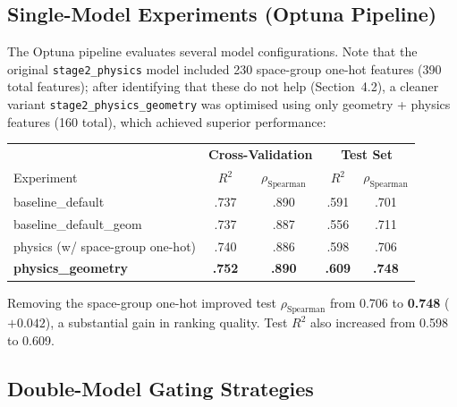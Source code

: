 \documentclass[11pt,a4paper]{article}
\newcommand{\Rtwo}{R^{2}}
\newcommand{\rhoS}{\rho_{\text{Spearman}}}
\begin{document}
\subsection{Single-Model Experiments (Optuna Pipeline)}

The Optuna pipeline evaluates several model configurations.  Note that the
original \texttt{stage2\_physics} model included 230 space-group one-hot
features (390 total features); after identifying that these do not help
(Section~4.2), a cleaner variant \texttt{stage2\_physics\_geometry} was
optimised using only geometry + physics features (160 total), which achieved
superior performance:

\begin{center}
      \small
      \begin{tabular}{lcc|cc}
            \toprule
                                             & \multicolumn{2}{c|}{\textbf{Cross-Validation}} & \multicolumn{2}{c}{\textbf{Test Set}}                                 \\
            Experiment                       & $\Rtwo$                                        & $\rhoS$                               & $\Rtwo$       & $\rhoS$       \\
            \midrule
            baseline\_default                & .737                                           & .890                                  & .591          & .701          \\
            baseline\_default\_geom          & .737                                           & .887                                  & .556          & .711          \\
            physics (w/ space-group one-hot) & .740                                           & .886                                  & .598          & .706          \\
            \textbf{physics\_geometry}       & \textbf{.752}                                  & \textbf{.890}                         & \textbf{.609} & \textbf{.748} \\
            \bottomrule
      \end{tabular}
\end{center}

Removing the space-group one-hot improved test $\rhoS$ from 0.706 to
\textbf{0.748} ($+0.042$), a substantial gain in ranking quality.
Test $\Rtwo$ also increased from 0.598 to 0.609.

\subsection{Double-Model Gating Strategies}
\end{document}
